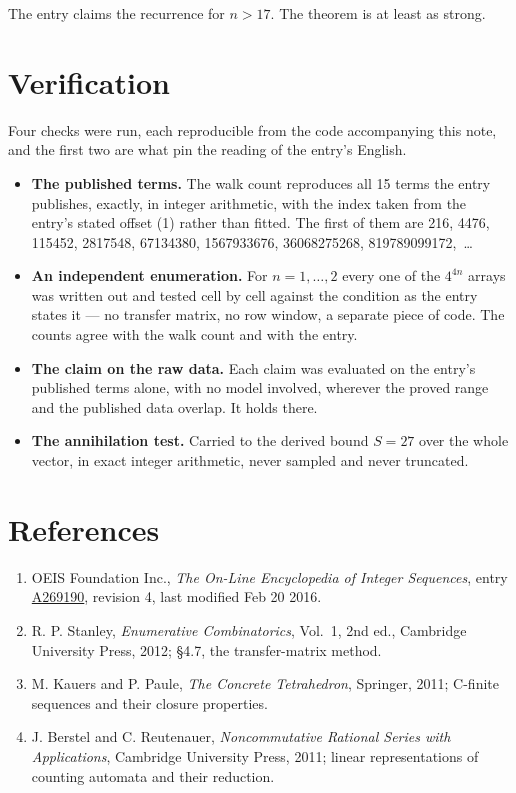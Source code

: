 \documentclass[11pt]{article}
\theoremstyle{definition}
\begin{document}
The entry claims the recurrence for $n > 17$. The theorem is at least as strong.

\section{Verification}

Four checks were run, each reproducible from the code accompanying this note, and the first two are what pin the reading of the entry's English.

\begin{itemize}

\item {\bfseries The published terms.} The walk count reproduces all 15 terms the entry publishes, exactly, in integer arithmetic, with the index taken from the entry's stated offset (1) rather than fitted. The first of them are 216, 4476, 115452, 2817548, 67134380, 1567933676, 36068275268, 819789099172,~\dots

\item {\bfseries An independent enumeration.} For $n = 1,\dots,2$ every one of the $4^{4n}$ arrays was written out and tested cell by cell against the condition as the entry states it --- no transfer matrix, no row window, a separate piece of code. The counts agree with the walk count and with the entry.

\item {\bfseries The claim on the raw data.} Each claim was evaluated on the entry's published terms alone, with no model involved, wherever the proved range and the published data overlap. It holds there.

\item {\bfseries The annihilation test.} Carried to the derived bound $S = 27$ over the whole vector, in exact integer arithmetic, never sampled and never truncated.

\end{itemize}

\section{References}

\begin{enumerate}

\item OEIS Foundation Inc., \emph{The On-Line Encyclopedia of Integer Sequences}, entry \href{https://oeis.org/A269190}{A269190}, revision 4, last modified Feb 20 2016.

\item R. P. Stanley, \emph{Enumerative Combinatorics}, Vol.~1, 2nd ed., Cambridge University Press, 2012; \S4.7, the transfer-matrix method.

\item M. Kauers and P. Paule, \emph{The Concrete Tetrahedron}, Springer, 2011; C-finite sequences and their closure properties.

\item J. Berstel and C. Reutenauer, \emph{Noncommutative Rational Series with Applications}, Cambridge University Press, 2011; linear representations of counting automata and their reduction.

\end{enumerate}
\end{document}
